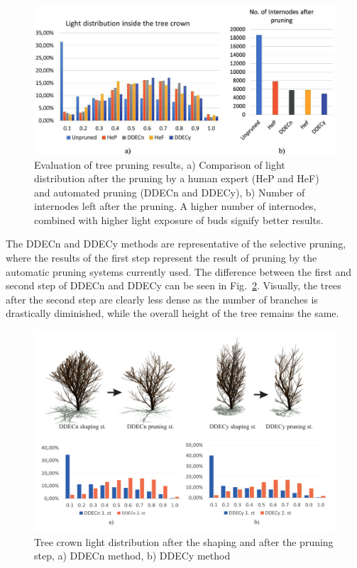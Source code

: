 \begin{figure}[hbt]
    \centering
    \includegraphics[width=5in]{figs/image5.jpeg}
    \caption{Evaluation of tree pruning results, a) Comparison of
light distribution after the pruning by a human expert (HeP and HeF) and
automated pruning (DDECn and DDECy), b) Number of internodes left after
the pruning. A higher number of internodes, combined with higher light
exposure of buds signify better results.}
\label{fig:my_figure5}
\end{figure}

The DDECn and DDECy methods are representative of the selective pruning, where the
results of the first step represent the result of pruning by the
automatic pruning systems currently used. The difference between the
first and second step of DDECn and DDECy can be seen in Fig.~\ref{fig:my_figure6}. Visually, the trees after the second step are clearly less dense as the number of branches is drastically diminished,
while the overall height of the tree remains the same.

\begin{figure}[hbt]
    \centering
    \includegraphics[width=5.4in]{figs/Fig7.pdf}
    \caption{Tree crown light distribution after the shaping and
after the pruning step, a) DDECn method, b) DDECy method}
    \label{fig:my_figure6}
\end{figure}

